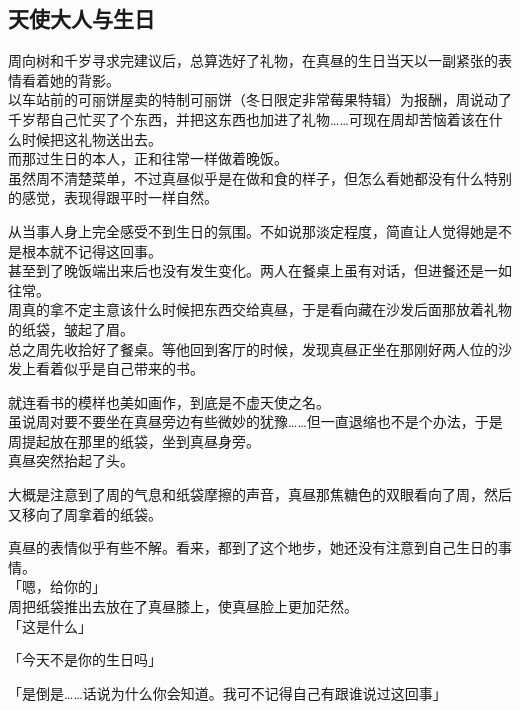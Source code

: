 \subsection{天使大人与生日}

周向树和千岁寻求完建议后，总算选好了礼物，在真昼的生日当天以一副紧张的表情看着她的背影。\\

以车站前的可丽饼屋卖的特制可丽饼（冬日限定非常莓果特辑）为报酬，周说动了千岁帮自己忙买了个东西，并把这东西也加进了礼物……可现在周却苦恼着该在什么时候把这礼物送出去。\\

而那过生日的本人，正和往常一样做着晚饭。\\

虽然周不清楚菜单，不过真昼似乎是在做和食的样子，但怎么看她都没有什么特别的感觉，表现得跟平时一样自然。

从当事人身上完全感受不到生日的氛围。不如说那淡定程度，简直让人觉得她是不是根本就不记得这回事。\\

甚至到了晚饭端出来后也没有发生变化。两人在餐桌上虽有对话，但进餐还是一如往常。\\

周真的拿不定主意该什么时候把东西交给真昼，于是看向藏在沙发后面那放着礼物的纸袋，皱起了眉。\\

总之周先收拾好了餐桌。等他回到客厅的时候，发现真昼正坐在那刚好两人位的沙发上看着似乎是自己带来的书。

就连看书的模样也美如画作，到底是不虚天使之名。\\

虽说周对要不要坐在真昼旁边有些微妙的犹豫……但一直退缩也不是个办法，于是周提起放在那里的纸袋，坐到真昼身旁。\\

真昼突然抬起了头。

大概是注意到了周的气息和纸袋摩擦的声音，真昼那焦糖色的双眼看向了周，然后又移向了周拿着的纸袋。

真昼的表情似乎有些不解。看来，都到了这个地步，她还没有注意到自己生日的事情。\\

「嗯，给你的」\\

周把纸袋推出去放在了真昼膝上，使真昼脸上更加茫然。\\

「这是什么」

「今天不是你的生日吗」

「是倒是……话说为什么你会知道。我可不记得自己有跟谁说过这回事」\\

